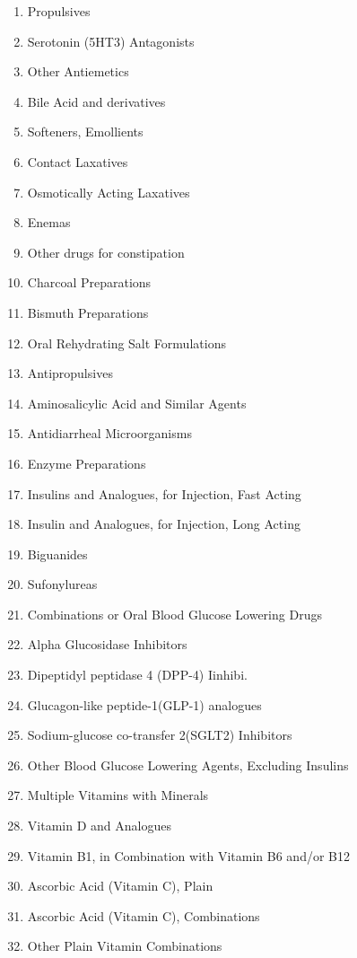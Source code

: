 \documentclass[a4paper,12pt]{article}
\begin{document}
\begin{appendices}
\begin{enumerate}
   			\item Propulsives
   			\item Serotonin (5HT3) Antagonists
   			\item Other Antiemetics
   			\item Bile Acid and derivatives
   			\item Softeners, Emollients
   			\item Contact Laxatives
   			\item Osmotically Acting Laxatives
   			\item Enemas
   			\item Other drugs for constipation
   			\item Charcoal Preparations
   			\item Bismuth Preparations
   			\item Oral Rehydrating Salt Formulations
   			\item Antipropulsives
   			\item Aminosalicylic Acid and Similar Agents
   			\item Antidiarrheal Microorganisms
   			\item Enzyme Preparations
   			\item Insulins and Analogues, for Injection, Fast Acting
   			\item Insulin and Analogues, for Injection, Long Acting
   			\item Biguanides
   			\item Sufonylureas
   			\item Combinations or Oral Blood Glucose Lowering Drugs
   			\item Alpha Glucosidase Inhibitors
   			\item Dipeptidyl peptidase 4 (DPP-4) Iinhibi.
   			\item Glucagon-like peptide-1(GLP-1) analogues
   			\item Sodium-glucose co-transfer 2(SGLT2) Inhibitors
   			\item Other Blood Glucose Lowering Agents, Excluding Insulins
   			\item Multiple Vitamins with Minerals
   			\item Vitamin D and Analogues
   			\item Vitamin B1, in Combination with Vitamin B6 and/or B12
   			\item Ascorbic Acid (Vitamin C), Plain
   			\item Ascorbic Acid (Vitamin C), Combinations
   			\item Other Plain Vitamin Combinations

\end{enumerate}
\end{appendices}
\end{document}
